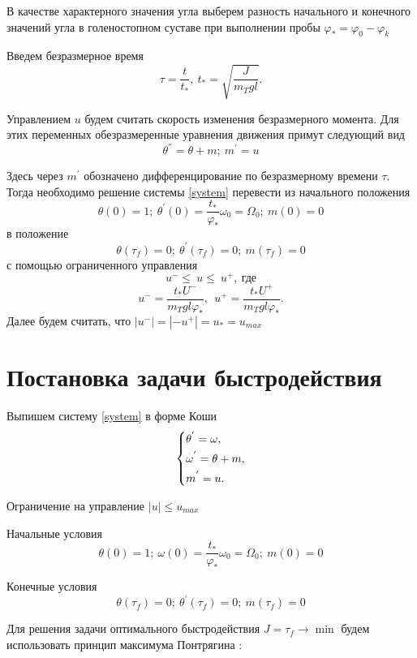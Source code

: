 \documentclass[a4paper,12pt, openany]{book}
\theoremstyle{plain} %
\theoremstyle{definition} %
\theoremstyle{remark} %
\numberwithin{equation}{chapter}
\begin{document}
{В качестве характерного значения угла выберем разность
начального и конечного значений угла в голеностопном
суставе при выполнении пробы $\varphi_\ast=\varphi_0-\varphi_k$

Введем безразмерное время
\[
    \tau=\frac{t}{t_\ast},\ t_\ast=\sqrt{\frac{J}{m_Tgl}}.
\]

Управлением $u$ будем считать скорость изменения безразмерного
момента. Для этих переменных обезразмеренные уравнения движения
примут следующий вид
\begin{equation}\label{system}
    \theta^{''}=\theta+m;\ m^{'}=u
\end{equation}

Здесь через $m^{'}$ обозначено дифференцирование по
безразмерному времени $\tau$. Тогда необходимо решение системы \eqref{system}
перевести из начального положения
\[
    \theta(0)=1;\ \theta^{'}(0)=\frac{t_\ast}{\varphi_\ast}\omega_0=\Omega_0;\ m(0)=0
\]
в положение
\[
    \theta(\tau_f)=0;\ \theta^{'}(\tau_f)=0;\ m(\tau_f)=0
\]
с помощью ограниченного управления
\[
    u^-\leqslant\ u\leqslant\ u^+,\ \text{где}
\]
\[
    u^-=\frac{t_\ast U^-}{m_Tgl\varphi_\ast },\ \ u^+=\frac{t_\ast U^+}{m_Tgl\varphi_\ast}.
\]
Далее будем считать, что $|u^-|=|-u^+|=u_\ast=u_{max}$

\section{Постановка задачи быстродействия}

Выпишем систему \eqref{system} в форме Коши
\begin{equation}\label{koshisystem}
    \left\{ {\begin{aligned}
                 & \theta^{'} = \omega , \hfill   \\
                 & \omega^{'} = \theta+m , \hfill \\
                 & m^{'} = u . \hfill             \\
            \end{aligned}} \right.
\end{equation}

Ограничение на управление $|u|\leqslant u_{max}$

Начальные условия
\[
    \theta(0)=1;\ \omega(0)=\frac{t_\ast}{\varphi_\ast}\omega_0=\Omega_0;\ m(0)=0
\]

Конечные условия
\[
    \theta(\tau_f)=0;\ \theta^{'}(\tau_f)=0;\ m(\tau_f)=0
\]


Для решения задачи оптимального быстродействия $J=\tau_f\to \min$ будем использовать принцип максимума Понтрягина \cite{Optimal}:

}
\end{document}
